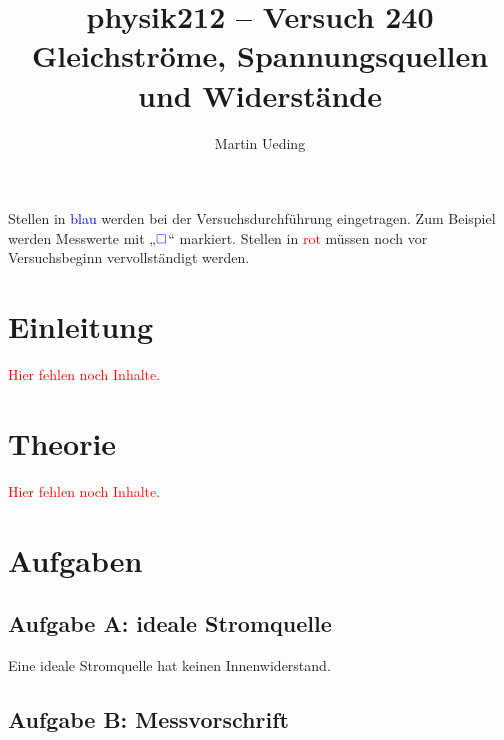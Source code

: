 \documentclass[11pt,german]{article}
\title{physik212 -- Versuch 240 \\ Gleichströme, Spannungsquellen und Widerstände}
\author{Martin Ueding}
\newcommand{\messwert}{\textcolor{blue}{\square}}
\newcommand{\fehlt}{\textcolor{red}{Hier fehlen noch Inhalte.}}
\begin{document}
\maketitle

\tableofcontents

\vfill

Stellen in \textcolor{blue}{blau} werden bei der Versuchsdurchführung eingetragen. Zum Beispiel werden Messwerte mit „$\messwert$“ markiert. Stellen in \textcolor{red}{rot} müssen noch vor Versuchsbeginn vervollständigt werden.

\newpage


\section{Einleitung}

\fehlt


\section{Theorie}

\fehlt


\section{Aufgaben}

\subsection{Aufgabe A: ideale Stromquelle}

Eine ideale Stromquelle hat keinen Innenwiderstand.

\subsection{Aufgabe B: Messvorschrift}
\end{document}
